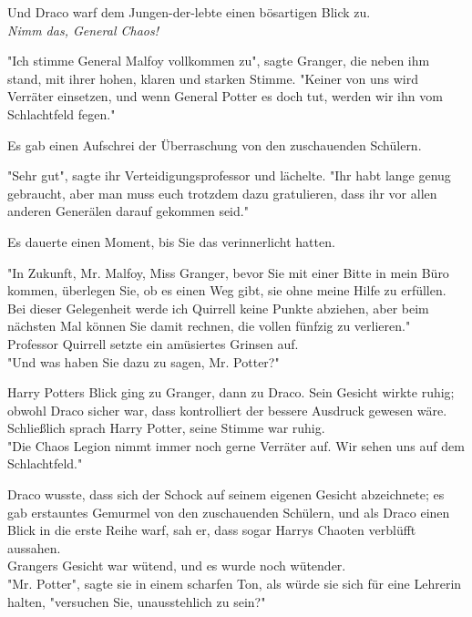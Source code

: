 {Und Draco warf dem Jungen-der-lebte einen bösartigen Blick zu.\\ \emph{Nimm das, General Chaos!}

"Ich stimme General Malfoy vollkommen zu", sagte Granger, die neben ihm stand, mit ihrer hohen, klaren und starken Stimme. "Keiner von uns wird Verräter einsetzen, und wenn General Potter es doch tut, werden wir ihn vom Schlachtfeld fegen."

Es gab einen Aufschrei der Überraschung von den zuschauenden Schülern.

"Sehr gut", sagte ihr Verteidigungsprofessor und lächelte. "Ihr habt lange genug gebraucht, aber man muss euch trotzdem dazu gratulieren, dass ihr vor allen anderen Generälen darauf gekommen seid."

Es dauerte einen Moment, bis Sie das verinnerlicht hatten.

"In Zukunft, Mr. Malfoy, Miss Granger, bevor Sie mit einer Bitte in mein Büro kommen, überlegen Sie, ob es einen Weg gibt, sie ohne meine Hilfe zu erfüllen.\\ Bei dieser Gelegenheit werde ich Quirrell keine Punkte abziehen, aber beim nächsten Mal können Sie damit rechnen, die vollen fünfzig zu verlieren."\\ Professor Quirrell setzte ein amüsiertes Grinsen auf.\\ "Und was haben Sie dazu zu sagen, Mr. Potter?"

Harry Potters Blick ging zu Granger, dann zu Draco. Sein Gesicht wirkte ruhig; obwohl Draco sicher war, dass kontrolliert der bessere Ausdruck gewesen wäre.\\ Schließlich sprach Harry Potter, seine Stimme war ruhig.\\ "Die Chaos Legion nimmt immer noch gerne Verräter auf. Wir sehen uns auf dem Schlachtfeld."

Draco wusste, dass sich der Schock auf seinem eigenen Gesicht abzeichnete; es gab erstauntes Gemurmel von den zuschauenden Schülern, und als Draco einen Blick in die erste Reihe warf, sah er, dass sogar Harrys Chaoten verblüfft aussahen.\\ Grangers Gesicht war wütend, und es wurde noch wütender.\\ "Mr. Potter", sagte sie in einem scharfen Ton, als würde sie sich für eine Lehrerin halten, "versuchen Sie, unausstehlich zu sein?"

}
